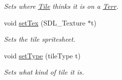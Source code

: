\begin{DoxyCompactItemize}
\begin{DoxyCompactList}\small\item\em Sets where \hyperlink{class_tile}{Tile} thinks it is on a \hyperlink{class_terr}{Terr}. \end{DoxyCompactList}\item 
void \hyperlink{class_tile_a2ec617aea3fcdfb023042e3712d3cdf3}{set\+Tex} (S\+D\+L\+\_\+\+Texture $\ast$t)\hypertarget{class_tile_a2ec617aea3fcdfb023042e3712d3cdf3}{}\label{class_tile_a2ec617aea3fcdfb023042e3712d3cdf3}

\begin{DoxyCompactList}\small\item\em Sets the tile spritesheet. \end{DoxyCompactList}\item 
void \hyperlink{class_tile_a2557595d030a43cf9b5334df3b7264f7}{set\+Type} (tile\+Type t)\hypertarget{class_tile_a2557595d030a43cf9b5334df3b7264f7}{}\label{class_tile_a2557595d030a43cf9b5334df3b7264f7}

\begin{DoxyCompactList}\small\item\em Sets what kind of tile it is. \end{DoxyCompactList}\end{DoxyCompactItemize}
